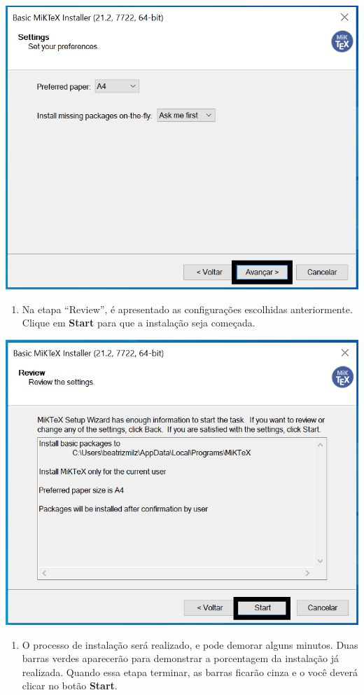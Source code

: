 \documentclass[
]{book}
\providecommand{\tightlist}{%
  \setlength{\itemsep}{0pt}\setlength{\parskip}{0pt}}
\begin{document}
\begin{center}\includegraphics[width=0.8\linewidth]{img/instalacao/miktex_windows/win_miktex4} \end{center}

\begin{enumerate}
\def\labelenumi{\arabic{enumi}.}
\setcounter{enumi}{5}
\tightlist
\item
  Na etapa ``Review'', é apresentado as configurações escolhidas anteriormente. Clique em \textbf{Start} para que a instalação seja começada.
\end{enumerate}

\begin{center}\includegraphics[width=0.8\linewidth]{img/instalacao/miktex_windows/win_miktex5} \end{center}

\begin{enumerate}
\def\labelenumi{\arabic{enumi}.}
\setcounter{enumi}{6}
\tightlist
\item
  O processo de instalação será realizado, e pode demorar alguns minutos. Duas barras verdes aparecerão para demonstrar a porcentagem da instalação já realizada. Quando essa etapa terminar, as barras ficarão cinza e o você deverá clicar no botão \textbf{Start}.
\end{enumerate}
\end{document}
